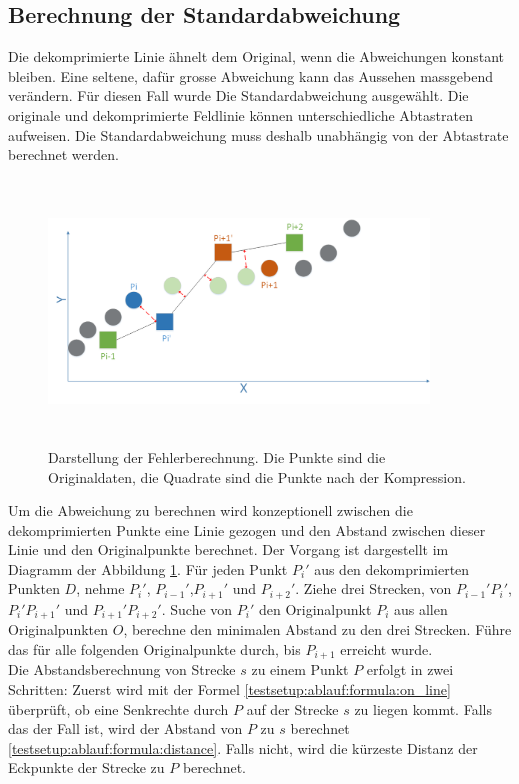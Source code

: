 \subsection{Berechnung der Standardabweichung}\label{testsetup:ablauf}
Die dekomprimierte Linie ähnelt dem Original, wenn die Abweichungen konstant bleiben. Eine seltene, dafür grosse Abweichung kann das Aussehen massgebend verändern. Für diesen Fall wurde Die Standardabweichung ausgewählt. Die originale und dekomprimierte Feldlinie können unterschiedliche Abtastraten aufweisen. Die Standardabweichung muss deshalb unabhängig von der Abtastrate berechnet werden.\\
\begin{figure}[!htbp]
	\center
	\includegraphics[width=0.9\textwidth,height=7cm,keepaspectratio]{./pictures/testsetup/errorcalc.png}
	\caption{Darstellung der Fehlerberechnung. Die Punkte sind die Originaldaten, die Quadrate sind die Punkte nach der Kompression.}
	\label{testsetup:ablauf:fehlerberechnung:diagramm}
\end{figure} 
Um die Abweichung zu berechnen wird konzeptionell zwischen die dekomprimierten Punkte eine Linie gezogen und den Abstand zwischen dieser Linie und den Originalpunkte berechnet. Der Vorgang ist dargestellt im Diagramm der Abbildung \ref{testsetup:ablauf:fehlerberechnung:diagramm}. Für jeden Punkt $P_i'$ aus den dekomprimierten Punkten $D$, nehme $P_i'$, $P_{i-1}'$,$P_{i+1}'$ und $P_{i+2}'$. Ziehe drei Strecken, von $P_{i-1}'P_i'$, $P_{i}'P_{i+1}'$ und $P_{i+1}'P_{i+2}'$. Suche von $P_i'$ den Originalpunkt $P_i$ aus allen Originalpunkten $O$, berechne den minimalen Abstand zu den drei Strecken. Führe das für alle folgenden Originalpunkte durch, bis $P_{i+1}$ erreicht wurde.\\
[\baselineskip]
Die Abstandsberechnung von Strecke $s$ zu einem Punkt $P$ erfolgt in zwei Schritten: Zuerst wird mit der Formel \eqref{testsetup:ablauf:formula:on_line} überprüft, ob eine Senkrechte durch $P$ auf der Strecke $s$ zu liegen kommt. Falls das der Fall ist, wird der Abstand von $P$ zu $s$ berechnet \eqref{testsetup:ablauf:formula:distance}. Falls nicht, wird die kürzeste Distanz der Eckpunkte der Strecke zu $P$ berechnet.\\
